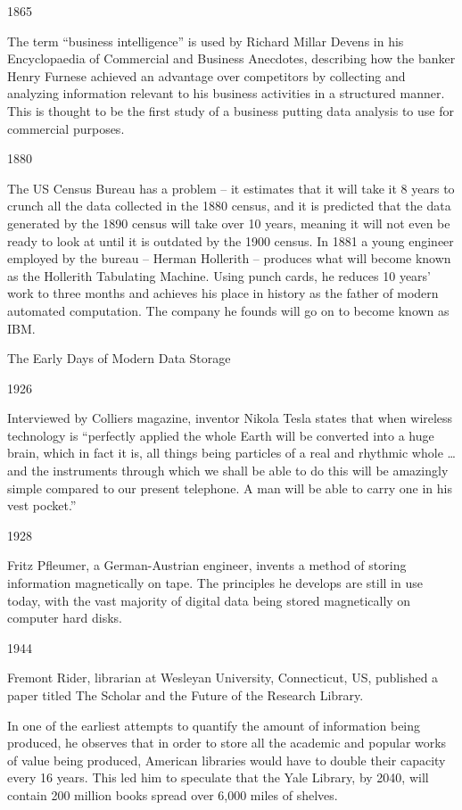 1865

The term “business intelligence” is used by Richard Millar Devens in his Encyclopaedia of Commercial and Business Anecdotes, describing how the banker Henry Furnese achieved an advantage over competitors by collecting and analyzing information relevant to his business activities in a structured manner. This is thought to be the first study of a business putting data analysis to use for commercial purposes.

1880

The US Census Bureau has a problem – it estimates that it will take it 8 years to crunch all the data collected in the 1880 census, and it is predicted that the data generated by the 1890 census will take over 10 years, meaning it will not even be ready to look at until it is outdated by the 1900 census. In 1881 a young engineer employed by the bureau – Herman Hollerith – produces what will become known as the Hollerith Tabulating Machine. Using punch cards, he reduces 10 years’ work to three months and achieves his place in history as the father of modern automated computation. The company he founds will go on to become known as IBM.

The Early Days of Modern Data Storage

1926

Interviewed by Colliers magazine, inventor Nikola Tesla states that when wireless technology is “perfectly applied the whole Earth will be converted into a huge brain, which in fact it is, all things being particles of a real and rhythmic whole … and the instruments through which we shall be able to do this will be amazingly simple compared to our present telephone. A man will be able to carry one in his vest pocket.”

1928

Fritz Pfleumer, a German-Austrian engineer, invents a method of storing information magnetically on tape. The principles he develops are still in use today, with the vast majority of digital data being stored magnetically on computer hard disks.

1944

Fremont Rider, librarian at Wesleyan University, Connecticut, US, published a paper titled The Scholar and the Future of the Research Library.

In one of the earliest attempts to quantify the amount of information being produced, he observes that in order to store all the academic and popular works of value being produced, American libraries would have to double their capacity every 16 years. This led him to speculate that the Yale Library, by 2040, will contain 200 million books spread over 6,000 miles of shelves.

